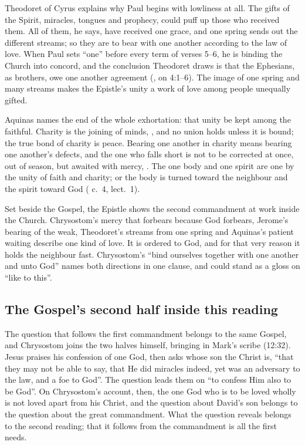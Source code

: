 Theodoret of Cyrus explains why Paul begins with lowliness at all. The gifts
of the Spirit, miracles, tongues and prophecy, could puff up those who
received them. All of them, he says, have received one grace, and one spring
sends out the different streams; so they are to bear with one another
according to the law of love. When Paul sets ``one'' before every term of
verses 5--6, he is binding the Church into concord, and the conclusion
Theodoret draws is that the Ephesians, as brothers, owe one another
agreement (, on 4:1--6). The image of
one spring and many streams makes the Epistle's unity a work of love among
people unequally gifted.

Aquinas names the end of the whole exhortation: that unity be kept among the
faithful. Charity is the joining of minds, , and no
union holds unless it is bound; the true bond of charity is peace. Bearing one
another in charity means bearing one another's defects, and the one who falls
short is not to be corrected at once, out of season, but awaited with mercy,
. The one body
and one spirit are one by the unity of faith and charity; or the body is
turned toward the neighbour and the spirit toward God ( c.~4, lect.~1).

Set beside the Gospel, the Epistle shows the second commandment at work
inside the Church. Chrysostom's mercy that forbears because God forbears,
Jerome's bearing of the weak, Theodoret's streams from one spring and
Aquinas's patient waiting describe one kind of love. It is ordered to God,
and for that very reason it holds the neighbour fast. Chrysostom's ``bind
ourselves together with one another and unto God'' names both directions in
one clause, and could stand as a gloss on ``like to this''.

\subsection{The Gospel's second half inside this reading}

The question that follows the first commandment belongs to the same Gospel,
and Chrysostom joins the two halves himself, bringing in Mark's scribe
(12:32). Jesus praises his confession of one God, then asks whose son the Christ is, ``that they may not
be able to say, that He did miracles indeed, yet was an adversary to the law,
and a foe to God''. The question leads them on ``to confess Him also to be
God''. On Chrysostom's account, then, the one God who is to be loved wholly
is not loved apart from his Christ, and the question about David's son
belongs to the question about the great commandment. What the question
reveals belongs to the second reading; that it follows from the commandment
is all the first needs.

